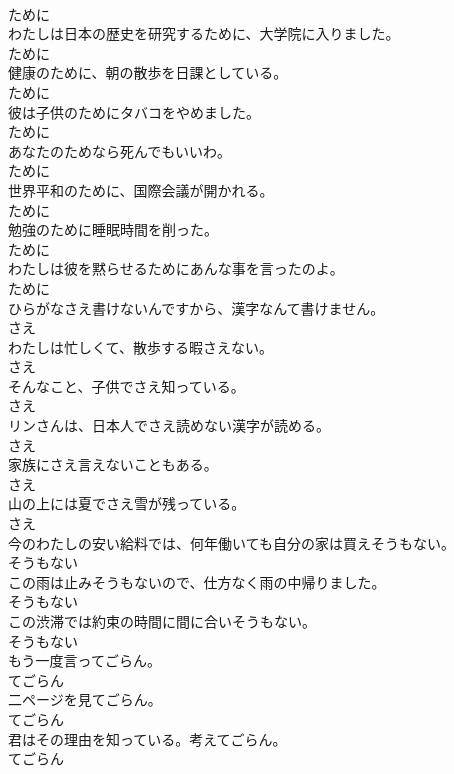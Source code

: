 \documentclass[8pt]{extreport}
\begin{document}
\begin{CJK}{UTF8}{min}
\\	ために
\\	わたしは日本の歴史を研究するために、大学院に入りました。	
\\	ために
\\	健康のために、朝の散歩を日課としている。	
\\	ために
\\	彼は子供のためにタバコをやめました。	
\\	ために
\\	あなたのためなら死んでもいいわ。	
\\	ために
\\	世界平和のために、国際会議が開かれる。	
\\	ために
\\	勉強のために睡眠時間を削った。	
\\	ために
\\	わたしは彼を黙らせるためにあんな事を言ったのよ。	
\\	ために
\\	ひらがなさえ書けないんですから、漢字なんて書けません。	
\\	さえ
\\	わたしは忙しくて、散歩する暇さえない。	
\\	さえ
\\	そんなこと、子供でさえ知っている。	
\\	さえ
\\	リンさんは、日本人でさえ読めない漢字が読める。	
\\	さえ
\\	家族にさえ言えないこともある。	
\\	さえ
\\	山の上には夏でさえ雪が残っている。	
\\	さえ
\\	今のわたしの安い給料では、何年働いても自分の家は買えそうもない。	
\\	そうもない
\\	この雨は止みそうもないので、仕方なく雨の中帰りました。	
\\	そうもない
\\	この渋滞では約束の時間に間に合いそうもない。	
\\	そうもない
\\	もう一度言ってごらん。	
\\	てごらん
\\	二ページを見てごらん。	
\\	てごらん
\\	君はその理由を知っている。考えてごらん。	
\\	てごらん

\end{CJK}
\end{document}
